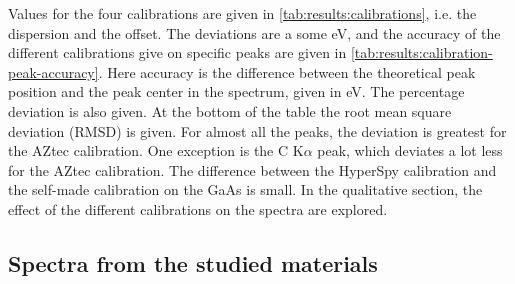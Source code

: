Values for the four calibrations are given in \cref{tab:results:calibrations}, i.e. the dispersion and the offset.
The deviations are a some eV, and the accuracy of the different calibrations give on specific peaks are given in \cref{tab:results:calibration-peak-accuracy}.
Here accuracy is the difference between the theoretical peak position and the peak center in the spectrum, given in eV.
The percentage deviation is also given.
At the bottom of the table the root mean square deviation (RMSD) is given.
For almost all the peaks, the deviation is greatest for the AZtec calibration.
One exception is the C K$\alpha$ peak, which deviates a lot less for the AZtec calibration. %
The difference between the HyperSpy calibration and the self-made calibration on the GaAs is small.
In the qualitative section, the effect of the different calibrations on the spectra are explored.











\subsection{Spectra from the studied materials}
\label{sec:results:qualitative:each_sample_area}

